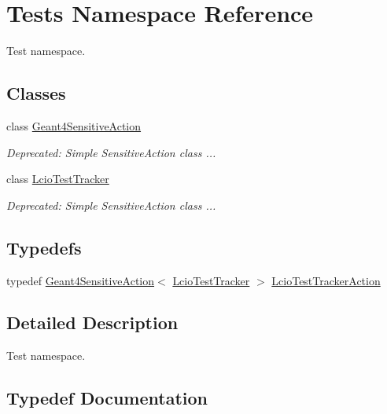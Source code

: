 \hypertarget{namespace_tests}{}\section{Tests Namespace Reference}
\label{namespace_tests}


Test namespace.  


\subsection*{Classes}
\begin{DoxyCompactItemize}
\item 
class \hyperlink{class_tests_1_1_geant4_sensitive_action}{Geant4\+Sensitive\+Action}
\begin{DoxyCompactList}\small\item\em Deprecated\+: Simple Sensitive\+Action class ... \end{DoxyCompactList}\item 
class \hyperlink{class_tests_1_1_lcio_test_tracker}{Lcio\+Test\+Tracker}
\begin{DoxyCompactList}\small\item\em Deprecated\+: Simple Sensitive\+Action class ... \end{DoxyCompactList}\end{DoxyCompactItemize}
\subsection*{Typedefs}
\begin{DoxyCompactItemize}
\item 
typedef \hyperlink{class_tests_1_1_geant4_sensitive_action}{Geant4\+Sensitive\+Action}$<$ \hyperlink{class_tests_1_1_lcio_test_tracker}{Lcio\+Test\+Tracker} $>$ \hyperlink{namespace_tests_a2a7625ddf8e6d0dad5175dfc61402755}{Lcio\+Test\+Tracker\+Action}
\end{DoxyCompactItemize}


\subsection{Detailed Description}
Test namespace. 

\subsection{Typedef Documentation}
\hypertarget{namespace_tests_a2a7625ddf8e6d0dad5175dfc61402755}{}\label{namespace_tests_a2a7625ddf8e6d0dad5175dfc61402755} 
